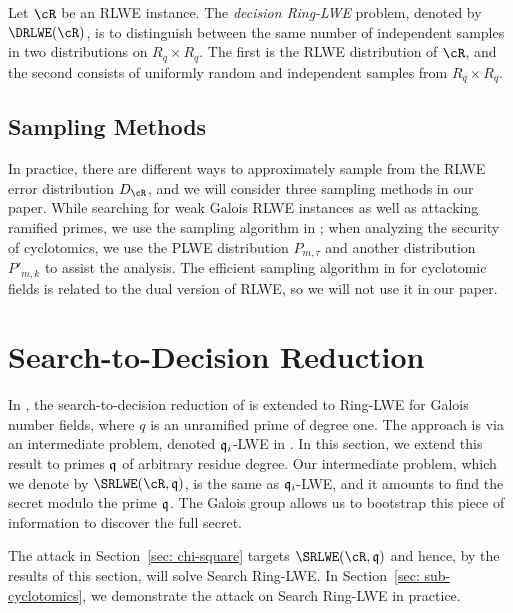 \documentclass[envcountsame]{llncs}
\begin{document}
\begin{definition}
Let $\cR$ be an RLWE instance. The {\it decision Ring-LWE}
problem, denoted by $\DRLWE(\cR)$, is to distinguish between the same number of independent samples in two distributions on $R_q \times R_q$. The first is the RLWE distribution of $\cR$, and the second consists of uniformly random and independent samples from $R_q \times R_q$.
\end{definition}

\subsection{Sampling Methods}
In practice, there are different ways to approximately sample from the RLWE error distribution $D_\cR$, and we will consider three sampling methods in our paper. While searching for weak Galois RLWE instances as well as attacking ramified primes, we use the sampling algorithm in  \cite{gentry2008trapdoors}; when analyzing the security of cyclotomics, we use the PLWE distribution $P_{m,\tau}$ and another distribution $P'_{m,k}$ to assist the analysis. The efficient sampling algorithm in \cite{lyubashevsky2013toolkit} for cyclotomic fields is related to the dual version of RLWE, so we will not use it in our paper.


\section{Search-to-Decision Reduction}
\label{sec: s-to-d}

In \cite{eisentrager2014weak}, the search-to-decision reduction of \cite{lyubashevsky2013ideal} is extended to Ring-LWE for Galois number fields, where $q$ is an unramified prime of degree one.  The approach is via an intermediate problem, denoted $\mathfrak{q}_i$-LWE in \cite{lyubashevsky2013ideal}.  In this section, we extend this result to primes $\mathfrak{q}$ of arbitrary residue degree.  Our intermediate problem, which we denote by $\SRLWE(\cR,\fq)$, is the same as $\mathfrak{q}_i$-LWE, and it amounts to find the secret modulo the prime $\mathfrak{q}$.  The Galois group allows us to bootstrap this piece of information to discover the full secret.

The attack in Section~\ref{sec: chi-square} targets $\SRLWE(\cR,\fq)$ and hence, by the results of this section, will solve Search Ring-LWE.  In Section~\ref{sec: sub-cyclotomics}, we demonstrate the attack on Search Ring-LWE in practice.

\end{document}
